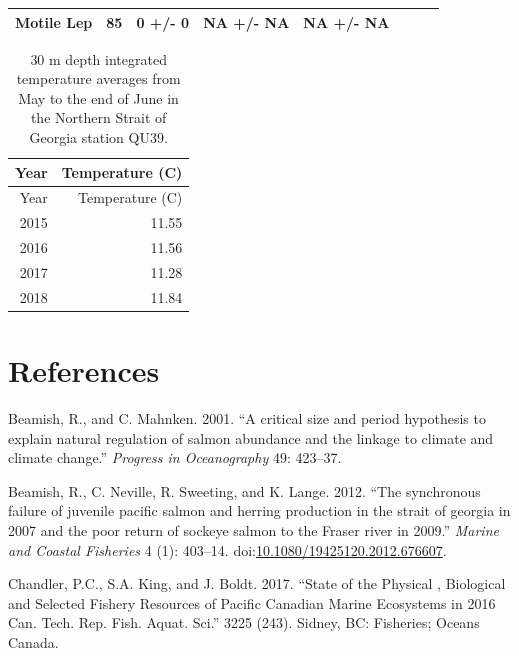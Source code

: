 \documentclass[fleqn,10pt]{wlpeerj} %
\begin{document}
\begin{longtable}[]{@{}llllrlll@{}}
\begin{minipage}[t]{0.11\columnwidth}
Motile Lep\strut
\end{minipage} & \begin{minipage}[t]{0.04\columnwidth}\raggedleft\strut
85\strut
\end{minipage} & \begin{minipage}[t]{0.14\columnwidth}\raggedright\strut
0 +/- 0\strut
\end{minipage} & \begin{minipage}[t]{0.14\columnwidth}\raggedright\strut
NA +/- NA\strut
\end{minipage} & \begin{minipage}[t]{0.14\columnwidth}\raggedright\strut
NA +/- NA\strut
\end{minipage}\tabularnewline
\bottomrule
\end{longtable}

\begin{longtable}[]{@{}rr@{}}
\caption{\label{tab:sst-table} 30 m depth integrated temperature averages
from May to the end of June in the Northern Strait of Georgia station
QU39.}\tabularnewline
\toprule
Year & Temperature (C)\tabularnewline
\midrule
\endfirsthead
\toprule
Year & Temperature (C)\tabularnewline
\midrule
\endhead
2015 & 11.55\tabularnewline
2016 & 11.56\tabularnewline
2017 & 11.28\tabularnewline
2018 & 11.84\tabularnewline
\bottomrule
\end{longtable}

\section*{References}\label{references}

\hypertarget{refs}{}
\hypertarget{ref-Beamish2001}{}
Beamish, R., and C. Mahnken. 2001. ``A critical size and period
hypothesis to explain natural regulation of salmon abundance and the
linkage to climate and climate change.'' \emph{Progress in Oceanography}
49: 423--37.

\hypertarget{ref-Beamish2012}{}
Beamish, R., C. Neville, R. Sweeting, and K. Lange. 2012. ``The
synchronous failure of juvenile pacific salmon and herring production in
the strait of georgia in 2007 and the poor return of sockeye salmon to
the Fraser river in 2009.'' \emph{Marine and Coastal Fisheries} 4 (1):
403--14.
doi:\href{https://doi.org/10.1080/19425120.2012.676607}{10.1080/19425120.2012.676607}.

\hypertarget{ref-Chandler2017}{}
Chandler, P.C., S.A. King, and J. Boldt. 2017. ``State of the Physical ,
Biological and Selected Fishery Resources of Pacific Canadian Marine
Ecosystems in 2016 Can. Tech. Rep. Fish. Aquat. Sci.'' 3225 (243).
Sidney, BC: Fisheries; Oceans Canada.
\end{document}
